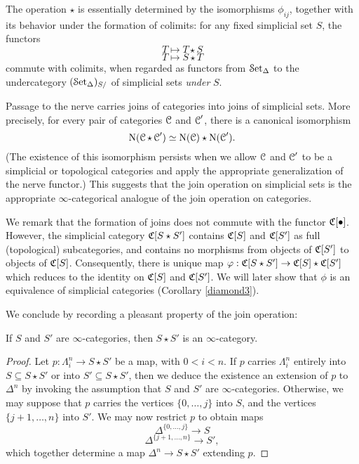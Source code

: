 \begin{1.2.8 Joins of inf-cats}
\begin{remark}
The operation $\star$ is essentially determined by the isomorphisms
$\phi_{ij}$, together with its behavior under the formation of
colimits: for any fixed simplicial set $S$, the functors
$$ T \mapsto T \star S$$
$$ T \mapsto S \star T$$
commute with colimits, when regarded as functors from $\operatorname{\mathcal{S}et_{\Delta}}$ to
the undercategory $(\operatorname{\mathcal{S}et_{\Delta}})_{S/}$ of simplicial sets {\em under} $S$.
\end{remark}

Passage to the nerve carries joins of
categories into joins of simplicial sets. More precisely, for every pair of
categories $\operatorname{\mathcal{C}}$ and $\operatorname{\mathcal{C}}'$, there is
a canonical isomorphism $$\operatorname{N}( \operatorname{\mathcal{C}} \star \operatorname{\mathcal{C}}') \simeq
\operatorname{N}(\operatorname{\mathcal{C}}) \star \operatorname{N}(\operatorname{\mathcal{C}}').$$ (The existence of this
isomorphism persists when we allow $\operatorname{\mathcal{C}}$ and $\operatorname{\mathcal{C}}'$ to be a simplicial or
topological categories and apply the appropriate generalization of
the nerve functor.) This suggests that the join operation on
simplicial sets is the appropriate $\infty$-categorical analogue of
the join operation on categories.

We remark that the formation of joins does not commute with the
functor $\operatorname{\mathfrak{C}}[\bullet]$. However, the simplicial category $\operatorname{\mathfrak{C}}[S \star S']$
contains $\operatorname{\mathfrak{C}}[S]$ and $\operatorname{\mathfrak{C}}[S']$ as full (topological)
subcategories, and contains no morphisms from objects of
$\operatorname{\mathfrak{C}}[S']$ to objects of $\operatorname{\mathfrak{C}}[S]$. Consequently, there is unique map $\varphi: \operatorname{\mathfrak{C}}[S \star S'] \rightarrow \operatorname{\mathfrak{C}}[S] \star \operatorname{\mathfrak{C}}[S']$ which reduces to the identity on
$\operatorname{\mathfrak{C}}[S]$ and $\operatorname{\mathfrak{C}}[S']$. We will later show that $\phi$ is an equivalence of simplicial categories (Corollary \ref{diamond3}).

We conclude by recording a pleasant property of the join
operation:

\begin{proposition}
If $S$ and $S'$ are $\infty$-categories, then $S \star S'$ is an $\infty$-category.
\end{proposition}

\begin{proof}
Let $p: \Lambda^n_i \rightarrow S \star S'$ be a map, with $0 < i
< n$. If $p$ carries $\Lambda^n_i$ entirely into $S \subseteq S
\star S'$ or into $S' \subseteq S \star S'$, then we deduce
the existence an extension of $p$ to $\Delta^n$ by invoking
the assumption that $S$ and $S'$ are $\infty$-categories. Otherwise,
we may suppose that $p$ carries the vertices $\{0, \ldots, j\}$
into $S$, and the vertices $\{ j+1, \ldots, n\}$ into $S'$. 
We may now restrict $p$ to obtain maps
$$ \Delta^{ \{ 0, \ldots, j \} } \rightarrow S$$
$$ \Delta^{ \{ j+1, \ldots, n \} } \rightarrow S',$$
which together determine a map $\Delta^n \rightarrow S \star S'$ extending $p$.
\end{proof}


\end{1.2.8 Joins of inf-cats}
